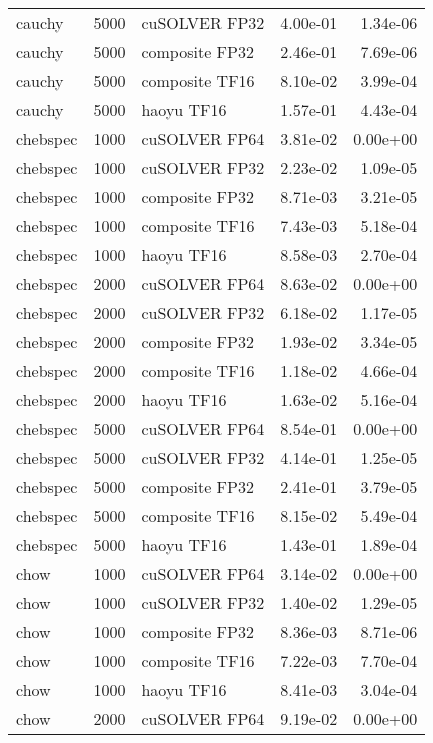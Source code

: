 \begin{table}
\begin{tabular}{lrlrr}
   cauchy &  5000 &  cuSOLVER FP32 &  4.00e-01 &        1.34e-06 \\
   cauchy &  5000 & composite FP32 &  2.46e-01 &        7.69e-06 \\
   cauchy &  5000 & composite TF16 &  8.10e-02 &        3.99e-04 \\
   cauchy &  5000 &     haoyu TF16 &  1.57e-01 &        4.43e-04 \\
 chebspec &  1000 &  cuSOLVER FP64 &  3.81e-02 &        0.00e+00 \\
 chebspec &  1000 &  cuSOLVER FP32 &  2.23e-02 &        1.09e-05 \\
 chebspec &  1000 & composite FP32 &  8.71e-03 &        3.21e-05 \\
 chebspec &  1000 & composite TF16 &  7.43e-03 &        5.18e-04 \\
 chebspec &  1000 &     haoyu TF16 &  8.58e-03 &        2.70e-04 \\
 chebspec &  2000 &  cuSOLVER FP64 &  8.63e-02 &        0.00e+00 \\
 chebspec &  2000 &  cuSOLVER FP32 &  6.18e-02 &        1.17e-05 \\
 chebspec &  2000 & composite FP32 &  1.93e-02 &        3.34e-05 \\
 chebspec &  2000 & composite TF16 &  1.18e-02 &        4.66e-04 \\
 chebspec &  2000 &     haoyu TF16 &  1.63e-02 &        5.16e-04 \\
 chebspec &  5000 &  cuSOLVER FP64 &  8.54e-01 &        0.00e+00 \\
 chebspec &  5000 &  cuSOLVER FP32 &  4.14e-01 &        1.25e-05 \\
 chebspec &  5000 & composite FP32 &  2.41e-01 &        3.79e-05 \\
 chebspec &  5000 & composite TF16 &  8.15e-02 &        5.49e-04 \\
 chebspec &  5000 &     haoyu TF16 &  1.43e-01 &        1.89e-04 \\
     chow &  1000 &  cuSOLVER FP64 &  3.14e-02 &        0.00e+00 \\
     chow &  1000 &  cuSOLVER FP32 &  1.40e-02 &        1.29e-05 \\
     chow &  1000 & composite FP32 &  8.36e-03 &        8.71e-06 \\
     chow &  1000 & composite TF16 &  7.22e-03 &        7.70e-04 \\
     chow &  1000 &     haoyu TF16 &  8.41e-03 &        3.04e-04 \\
     chow &  2000 &  cuSOLVER FP64 &  9.19e-02 &        0.00e+00 \\

\end{tabular}
\end{table}
